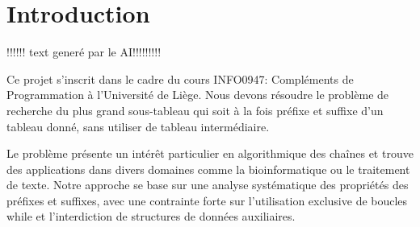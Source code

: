 \section{Introduction}\label{introduction}



!!!!!! text generé par le AI!!!!!!!!!

Ce projet s'inscrit dans le cadre du cours INFO0947:
Compléments de Programmation à l'Université de Liège.
Nous devons résoudre le problème de recherche du plus grand
sous-tableau qui soit à la fois préfixe et suffixe d'un tableau donné, sans utiliser de tableau intermédiaire.

Le problème présente un intérêt particulier en algorithmique des chaînes et trouve des applications
dans divers domaines comme la bioinformatique ou le traitement de texte. Notre approche se base sur
une analyse systématique des propriétés des préfixes et suffixes, avec une contrainte forte sur
l'utilisation exclusive de boucles while et l'interdiction de structures de données auxiliaires.
